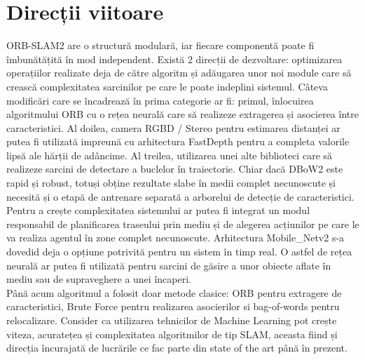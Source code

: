 \documentclass[12pt,a4paper]{report}
\begin{document}
\section{Direcții viitoare}
ORB-SLAM2 are o structură modulară, iar fiecare componentă poate fi îmbunătățită 
în mod independent. Există 2 direcții de dezvoltare: optimizarea operațiilor 
realizate deja de către algoritm și adăugarea unor noi module care să crească 
complexitatea sarcinilor pe care le poate indeplini sistemul. Câteva modificări 
care se încadrează în prima categorie ar fi: primul, înlocuirea algoritmului ORB cu 
o rețea neurală care să realizeze extragerea și asocierea între caracteristici. 
Al doilea, camera RGBD / Stereo pentru estimarea distanței ar putea fi utilizată impreună cu 
arhitectura FastDepth pentru a completa valorile lipsă ale hărții de adâncime.
Al treilea, utilizarea unei alte biblioteci care să realizeze sarcini de detectare a buclelor
în traiectorie. Chiar dacă DBoW2 este rapid și robust, totuși obține rezultate 
slabe în medii complet necunoscute și necesită și o etapă de antrenare separată a
arborelui de detecție de caracteristici. Pentru a crește complexitatea sistemului ar putea
fi integrat un modul responsabil de planificarea traseului prin mediu și de alegerea 
acțiunilor pe care le va realiza agentul în zone complet necunoscute. Arhitectura 
Mobile\_Netv2 s-a dovedid deja o opțiune potrivită pentru un sistem în timp real. 
O astfel de rețea neurală ar putea fi utilizată pentru sarcini de găsire a unor 
obiecte aflate în mediu sau de supraveghere a unei încaperi. \\
Până acum algoritmul a folosit doar metode clasice: ORB pentru extragere de caracteristici,
Brute Force pentru realizarea asocierilor si bag-of-words pentru relocalizare.
Consider ca utilizarea tehnicilor de Machine Learning pot crește viteza, acuratețea 
și complexitatea algoritmilor de tip SLAM, aceasta fiind și direcția încurajată de lucrările
ce fac parte din state of the art până în prezent.
\printbibliography
\end{document}
